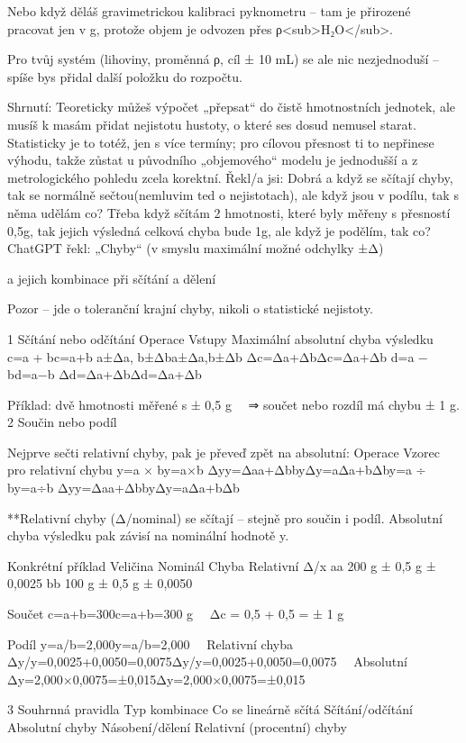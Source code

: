 {    Nebo když děláš gravimetrickou kalibraci pyknometru – tam je přirozené pracovat jen v g, protože objem je odvozen přes ρ<sub>H₂O</sub>.

Pro tvůj systém (lihoviny, proměnná ρ, cíl ± 10 mL) se ale nic nezjednoduší – spíše bys přidal další položku do rozpočtu.

Shrnutí:
Teoreticky můžeš výpočet „přepsat“ do čistě hmotnostních jednotek, ale musíš k masám přidat nejistotu hustoty, o které ses dosud nemusel starat. Statisticky je to totéž, jen s více termíny; pro cílovou přesnost ti to nepřinese výhodu, takže zůstat u původního „objemového“ modelu je jednodušší a z metrologického pohledu zcela korektní.
Řekl/a jsi:
Dobrá a když se sčítají chyby, tak se normálně sečtou(nemluvim ted o nejistotach), ale když jsou v podílu, tak s něma udělám co? Třeba když sčítám 2 hmotnosti, které byly měřeny s přesností 0,5g, tak jejich výsledná celková chyba bude 1g, ale když je podělím, tak co?
ChatGPT řekl:
„Chyby“ (v smyslu maximální možné odchylky ±Δ)

a jejich kombinace při sčítání a dělení

    Pozor – jde o toleranční krajní chyby, nikoli o statistické nejistoty.

1  Sčítání nebo odčítání
Operace	Vstupy	Maximální absolutní chyba výsledku
c=a  +  bc=a+b	a±Δa,  b±Δba±Δa,b±Δb	Δc=Δa+ΔbΔc=Δa+Δb
d=a  −  bd=a−b		Δd=Δa+ΔbΔd=Δa+Δb

Příklad: dvě hmotnosti měřené s ± 0,5 g
 ⇒ součet nebo rozdíl má chybu ± 1 g.
2  Součin nebo podíl

Nejprve sečti relativní chyby, pak je převeď zpět na absolutní:
Operace	Vzorec pro relativní chybu
y=a  ×  by=a×b	Δyy=Δaa+ΔbbyΔy​=aΔa​+bΔb​
y=a  ÷  by=a÷b	Δyy=Δaa+ΔbbyΔy​=aΔa​+bΔb​

    **Relativní chyby (Δ/nominal) se sčítají – stejně pro součin i podíl.
    Absolutní chyba výsledku pak závisí na nominální hodnotě y.

Konkrétní příklad
Veličina	Nominál	Chyba	Relativní Δ/x
aa	200 g	± 0,5 g	± 0,0025
bb	100 g	± 0,5 g	± 0,0050

    Součet c=a+b=300c=a+b=300 g
     Δc = 0,5 + 0,5 = ± 1 g

    Podíl y=a/b=2,000y=a/b=2,000
     Relativní chyba Δy/y=0,0025+0,0050=0,0075Δy/y=0,0025+0,0050=0,0075
     Absolutní Δy=2,000×0,0075=±0,015Δy=2,000×0,0075=±0,015

3  Souhrnná pravidla
Typ kombinace	Co se lineárně sčítá
Sčítání/odčítání	Absolutní chyby
Násobení/dělení	Relativní (procentní) chyby

}

